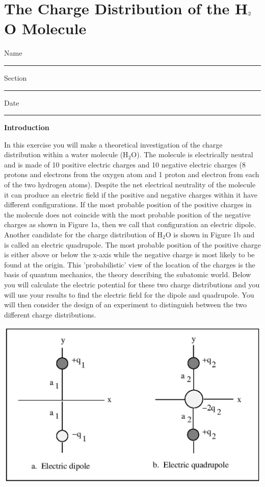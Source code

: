 
\section{The Charge Distribution of the H\protect\( _{2}\protect \)O Molecule}

Name \rule{2.0in}{0.1pt}\hfill{}Section \rule{1.0in}{0.1pt}\hfill{}Date
\rule{1.0in}{0.1pt}

\textbf{Introduction}

In this exercise you will make a theoretical investigation of the
charge distribution within a water molecule (H\( _{2} \)O). The molecule
is electrically neutral and is made of 10 positive electric charges
and 10 negative electric charges (8 protons and electrons from the
oxygen atom and 1 proton and electron from each of the two hydrogen
atoms). Despite the net electrical neutrality of the molecule it can
produce an electric field if the positive and negative charges within
it have different configurations. If the most probable position of
the positive charges in the molecule does not coincide with the most
probable position of the negative charges as shown in Figure 1a, then
we call that configuration an electric dipole. Another candidate for
the charge distribution of H\( _{2} \)O is shown in Figure 1b and
is called an electric quadrupole. The most probable position of the
positive charge is either above or below the x-axis while the negative
charge is most likely to be found at the origin. This 'probabilistic'
view of the location of the charges is the basis of quantum mechanics,
the theory describing the subatomic world. Below you will calculate
the electric potential for these two charge distributions and you
will use your results to find the electric field for the dipole and
quadrupole. You will then consider the design of an experiment to
distinguish between the two different charge distributions.

\vspace{0.3cm}
{\centering \includegraphics{charge_dist_water_mol_fig_1.eps} \par}
\vspace{0.3cm}

